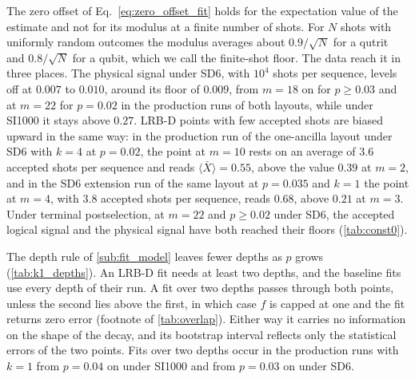 The zero offset of Eq.~\eqref{eq:zero_offset_fit} holds for the expectation value of the estimate and not for its modulus at a finite number of shots. For $N$ shots with uniformly random outcomes the modulus averages about $0.9/\sqrt{N}$ for a qutrit and $0.8/\sqrt{N}$ for a qubit, which we call the finite-shot floor. The data reach it in three places. The physical signal under SD6, with $10^4$ shots per sequence, levels off at $0.007$ to $0.010$, around its floor of $0.009$, from $m = 18$ on for $p \ge 0.03$ and at $m = 22$ for $p = 0.02$ in the production runs of both layouts, while under SI1000 it stays above $0.27$. LRB-D points with few accepted shots are biased upward in the same way: in the production run of the one-ancilla layout under SD6 with $k = 4$ at $p = 0.02$, the point at $m = 10$ rests on an average of $3.6$ accepted shots per sequence and reads $\langle \bar{X} \rangle = 0.55$, above the value $0.39$ at $m = 2$, and in the SD6 extension run of the same layout at $p = 0.035$ and $k = 1$ the point at $m = 4$, with $3.8$ accepted shots per sequence, reads $0.68$, above $0.21$ at $m = 3$. Under terminal postselection, at $m = 22$ and $p \ge 0.02$ under SD6, the accepted logical signal and the physical signal have both reached their floors (\autoref{tab:const0}).

The depth rule of \autoref{sub:fit_model} leaves fewer depths as $p$ grows (\autoref{tab:k1_depths}). An LRB-D fit needs at least two depths, and the baseline fits use every depth of their run. A fit over two depths passes through both points, unless the second lies above the first, in which case $f$ is capped at one and the fit returns zero error (footnote of \autoref{tab:overlap}). Either way it carries no information on the shape of the decay, and its bootstrap interval reflects only the statistical errors of the two points. Fits over two depths occur in the production runs with $k = 1$ from $p = 0.04$ on under SI1000 and from $p = 0.03$ on under SD6.

